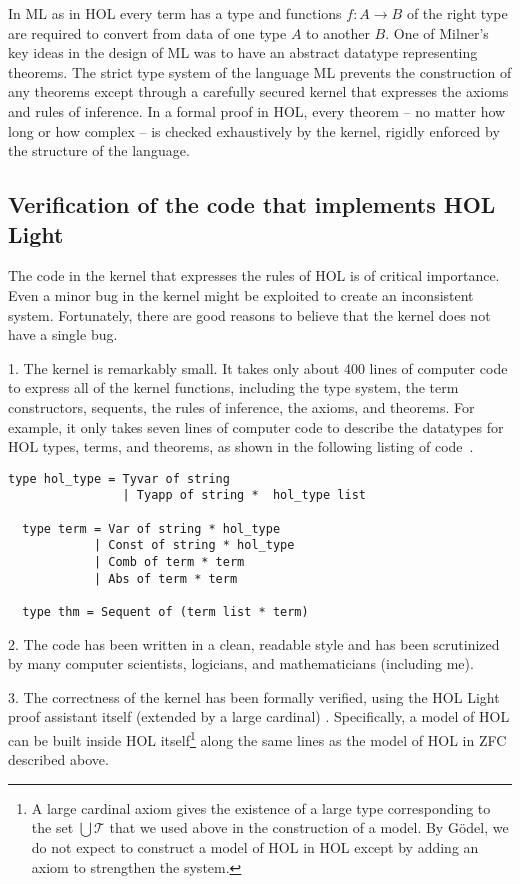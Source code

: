 \documentclass[brochure,english,12pt]{bourbaki}
\theoremstyle{plain}
\def\T{{\mathcal T}}
\begin{document}
In ML as in HOL every term has a type and  functions $f:A\to B$ of the right type
are required to convert from data of one type $A$ to another $B$.
One of Milner's key ideas in the design of ML was to have an abstract datatype representing theorems.
The strict type system of the language ML prevents the construction of any theorems except through
a carefully secured kernel that expresses the axioms and rules of inference.  In a formal proof in HOL, 
every theorem -- no matter how long or how complex -- is checked exhaustively by the kernel,
rigidly enforced by the structure of the language.

\subsection{Verification of the code that implements HOL Light}

The code in the kernel that expresses the rules of HOL is of critical importance.  
Even a minor bug in the kernel might be exploited to create an inconsistent system.  Fortunately,
there are good reasons to believe that the kernel does not have a single bug.

1.  The kernel is remarkably small.  It takes only about 400 lines of computer code to express
all of the kernel functions, including the type system, the term constructors, sequents, the rules of inference,
the axioms, and theorems.  For example, it only takes seven lines of computer code to describe the datatypes
for HOL types, terms, and theorems, as shown in the following listing of code~\cite{HOLL}.

\begin{lstlisting}[keepspaces=true,stringstyle=\tt,basicstyle=\small,frame=single,framesep=8pt,mathescape,morekeywords={type},columns=flexible]
  type hol_type = Tyvar of string
                | Tyapp of string *  hol_type list

  type term = Var of string * hol_type
            | Const of string * hol_type
            | Comb of term * term
            | Abs of term * term

  type thm = Sequent of (term list * term)
\end{lstlisting}

2.  The code has been written in a clean, readable style and has been scrutinized by many computer scientists,
logicians, and mathematicians (including me).

3.  The correctness of the kernel has been formally verified, using the HOL Light proof assistant itself (extended by a large
cardinal) \cite{HaSelf}.  Specifically,
a model of HOL can be built inside HOL itself\footnote{A large cardinal axiom 
 gives the existence of a large type corresponding to the set $\bigcup\T$ that we used above in the construction of a model.
By G\"odel, we do not expect to construct a model of HOL in HOL except by 
adding an axiom to strengthen the system.} along the same
lines as the model of HOL in ZFC described above.  
\end{document}

